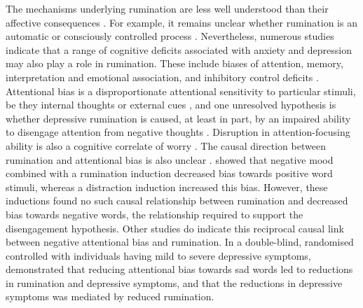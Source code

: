 \documentclass[man,floatsintext,a4paper,biblatex]{apa6}\usepackage[]{graphicx}\usepackage[]{color}
\begin{document}
The mechanisms underlying rumination are less well understood than their
affective consequences \parencite{koster_understanding_2011}. For example,
it remains unclear whether rumination is an automatic or consciously
controlled process \parencite{smith_roadmap_2009}. Nevertheless,
numerous studies indicate that a range of cognitive deficits
associated with anxiety and depression may also play a role
in rumination. These include biases of attention, memory,
interpretation and emotional association, and inhibitory control
deficits \parencite{mathews_cognitive_2005}. Attentional bias is a
disproportionate attentional sensitivity to particular stimuli, be they
internal thoughts or external cues \parencite{williams_cognitive_1997},
and one unresolved hypothesis is whether depressive rumination is caused,
at least in part, by an impaired ability to disengage attention from
negative thoughts \parencite{koster_understanding_2011}. Disruption
in attention-focusing ability is also a cognitive correlate
of worry \parencite{borkovec_preliminary_1983}. The causal
direction between rumination and attentional bias is also unclear
\parencite{koster_understanding_2011}. \textcite{morrison_role_2008}
showed that negative mood combined with a rumination induction
decreased bias towards positive word stimuli, whereas a distraction
induction increased this bias. However, these inductions found no
such causal relationship between rumination and decreased bias towards
negative words, the relationship required to support the disengagement
hypothesis. Other studies do indicate this reciprocal causal link between
negative attentional bias and rumination. In a double-blind, randomised
controlled with individuals having mild to severe depressive symptoms,
\textcite{yang_attention_2015} demonstrated that reducing attentional
bias towards sad words led to reductions in rumination and depressive
symptoms, and that the reductions in depressive symptoms was mediated
by reduced rumination.
\end{document}

